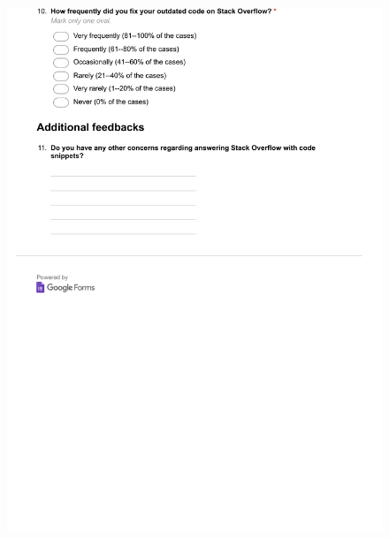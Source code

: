 \documentclass{svjour3}                     %
\begin{document}
\begin{figure}[H]
	\centering
	\includegraphics[width=0.9\linewidth]{answerer-4}
	\label{fig:answerer-4}
\end{figure}
\end{document}
